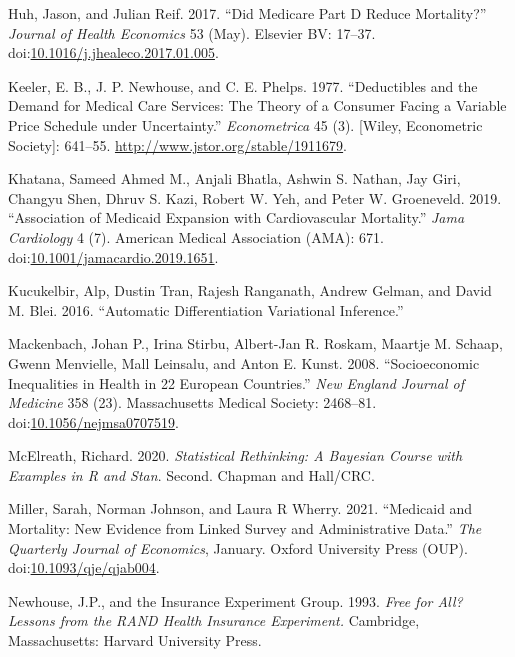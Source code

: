 \documentclass[a4paper,12pt]{article}
\begin{document}
\hypertarget{citeproc_bib_item_14}{Huh, Jason, and Julian Reif. 2017. “Did Medicare Part D Reduce Mortality?” \textit{Journal of Health Economics} 53 (May). Elsevier BV: 17–37. doi:\href{https://doi.org/10.1016/j.jhealeco.2017.01.005}{10.1016/j.jhealeco.2017.01.005}.}

\hypertarget{citeproc_bib_item_15}{Keeler, E. B., J. P. Newhouse, and C. E. Phelps. 1977. “Deductibles and the Demand for Medical Care Services: The Theory of a Consumer Facing a Variable Price Schedule under Uncertainty.” \textit{Econometrica} 45 (3). [Wiley, Econometric Society]: 641–55. \url{http://www.jstor.org/stable/1911679}.}

\hypertarget{citeproc_bib_item_16}{Khatana, Sameed Ahmed M., Anjali Bhatla, Ashwin S. Nathan, Jay Giri, Changyu Shen, Dhruv S. Kazi, Robert W. Yeh, and Peter W. Groeneveld. 2019. “Association of Medicaid Expansion with Cardiovascular Mortality.” \textit{Jama Cardiology} 4 (7). American Medical Association (AMA): 671. doi:\href{https://doi.org/10.1001/jamacardio.2019.1651}{10.1001/jamacardio.2019.1651}.}

\hypertarget{citeproc_bib_item_17}{Kucukelbir, Alp, Dustin Tran, Rajesh Ranganath, Andrew Gelman, and David M. Blei. 2016. “Automatic Differentiation Variational Inference.”}

\hypertarget{citeproc_bib_item_18}{Mackenbach, Johan P., Irina Stirbu, Albert-Jan R. Roskam, Maartje M. Schaap, Gwenn Menvielle, Mall Leinsalu, and Anton E. Kunst. 2008. “Socioeconomic Inequalities in Health in 22 European Countries.” \textit{New England Journal of Medicine} 358 (23). Massachusetts Medical Society: 2468–81. doi:\href{https://doi.org/10.1056/nejmsa0707519}{10.1056/nejmsa0707519}.}

\hypertarget{citeproc_bib_item_19}{McElreath, Richard. 2020. \textit{Statistical Rethinking: A Bayesian Course with Examples in R and Stan}. Second. Chapman and Hall/CRC.}

\hypertarget{citeproc_bib_item_20}{Miller, Sarah, Norman Johnson, and Laura R Wherry. 2021. “Medicaid and Mortality: New Evidence from Linked Survey and Administrative Data.” \textit{The Quarterly Journal of Economics}, January. Oxford University Press (OUP). doi:\href{https://doi.org/10.1093/qje/qjab004}{10.1093/qje/qjab004}.}

\hypertarget{citeproc_bib_item_21}{Newhouse, J.P., and the Insurance Experiment Group. 1993. \textit{Free for All? Lessons from the RAND Health Insurance Experiment.} Cambridge, Massachusetts: Harvard University Press.}
\end{document}
